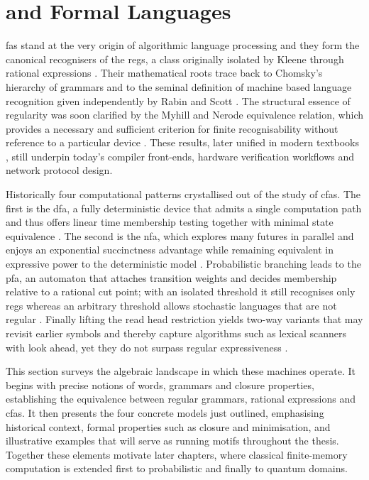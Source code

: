 \section{ and Formal Languages}\label{sec:cfa-languages}

\glspl{fa} stand at the very origin of algorithmic language processing and they form the canonical recognisers of the \glspl{reg}, a class originally isolated by Kleene through rational expressions \cite{kleene1951representationof}. Their mathematical roots trace back to Chomsky's hierarchy of grammars \cite{chomsky1959certain} and to the seminal definition of machine based language recognition given independently by Rabin and Scott \cite{rabin1959finite}. The structural essence of regularity was soon clarified by the Myhill and Nerode equivalence relation, which provides a necessary and sufficient criterion for finite recognisability without reference to a particular device \cite{myhill1957finite,nerode1958linear}. These results, later unified in modern textbooks \cite{hopcroft2001introduction,aho1974design,sipser1996introduction}, still underpin today's compiler front-ends, hardware verification workflows and network protocol design.

Historically four computational patterns crystallised out of the study of \glspl{cfa}. The first is the \gls{dfa}, a fully deterministic device that admits a single computation path and thus offers linear time membership testing together with minimal state equivalence \cite{hopcroft2001introduction}. The second is the \gls{nfa}, which explores many futures in parallel and enjoys an exponential succinctness advantage while remaining equivalent in expressive power to the deterministic model \cite{rabin1959finite}. Probabilistic branching leads to the \gls{pfa}, an automaton that attaches transition weights and decides membership relative to a rational cut point; with an isolated threshold it still recognises only \glspl{reg} \cite{paz2014introduction} whereas an arbitrary threshold allows stochastic languages that are not regular \cite{turakainen1969generalized}. Finally lifting the read head restriction yields two-way variants that may revisit earlier symbols and thereby capture algorithms such as lexical scanners with look ahead, yet they do not surpass regular expressiveness \cite{freivalds1981probabilistic}.

This section surveys the algebraic landscape in which these machines operate. It begins with precise notions of words, grammars and closure properties, establishing the equivalence between regular grammars, rational expressions and \glspl{cfa}. It then presents the four concrete models just outlined, emphasising historical context, formal properties such as closure and minimisation, and illustrative examples that will serve as running motifs throughout the thesis. Together these elements motivate later chapters, where classical finite-memory computation is extended first to probabilistic and finally to quantum domains.

